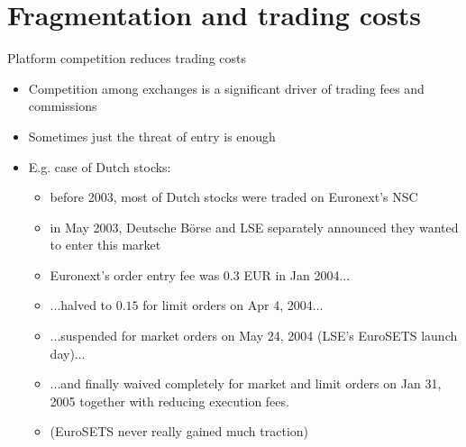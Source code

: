 \documentclass[english,10pt
,aspectratio=169
]{beamer}
\begin{document}
\section{Fragmentation and trading costs}

\begin{frame}{Platform competition reduces trading costs}
	\begin{itemize}
		\item Competition among exchanges is a significant driver of trading fees and commissions
		\item Sometimes just the threat of entry is enough
		\item E.g. case of Dutch stocks:
		\begin{exampleblock}{}
			\begin{itemize}
				\item before 2003, most of Dutch stocks were traded on Euronext's NSC
				\item in May 2003, Deutsche B{\"o}rse and LSE separately announced they wanted to enter this market
				\item Euronext's \alert{order entry fee} was $0.3$ EUR in Jan 2004...
				\item ...halved to $0.15$ for limit orders on Apr 4, 2004...
				\item ...suspended for market orders on May 24, 2004 (LSE's EuroSETS launch day)...
				\item ...and finally waived completely for market and limit orders on Jan 31, 2005 together with reducing execution fees.
				\item (EuroSETS never really gained much traction)
			\end{itemize}
		\end{exampleblock}
	\end{itemize}
\end{frame}
\end{document}
